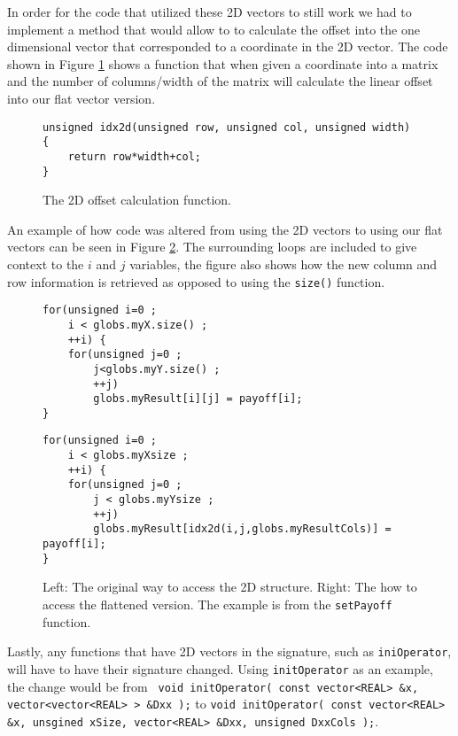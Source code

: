 In order for the code that utilized these 2D vectors to still work we had to
implement a method that would allow to to calculate the offset into the one
dimensional vector that corresponded to a coordinate in the 2D vector. The code
shown in Figure \ref{code:idx2d} shows a function that when given a coordinate
into a matrix and the number of columns/width of the matrix will calculate the
linear offset into our flat vector version.

\begin{figure}[H]
    \begin{lstlisting}
unsigned idx2d(unsigned row, unsigned col, unsigned width) {
    return row*width+col;
}
    \end{lstlisting}
    \caption{The 2D offset calculation function.}
    \label{code:idx2d}
\end{figure}

An example of how code was altered from using the 2D vectors to using our flat
vectors can be seen in Figure \ref{code:2dto1dcoord}. The surrounding loops are
included to give context to the $i$ and $j$ variables, the figure also shows how
the new column and row information is retrieved as opposed to using the
\texttt{size()} function.

\begin{figure}[H]
    \begin{minipage}{.45\textwidth}
        \begin{lstlisting}
for(unsigned i=0 ;
    i < globs.myX.size() ;
    ++i) {
    for(unsigned j=0 ;
        j<globs.myY.size() ;
        ++j) 
        globs.myResult[i][j] = payoff[i];
}
        \end{lstlisting}
    \end{minipage}\hfill
    \begin{minipage}{.45\textwidth}
        \begin{lstlisting}
for(unsigned i=0 ;
    i < globs.myXsize ;
    ++i) {
    for(unsigned j=0 ;
        j < globs.myYsize ;
        ++j) 
        globs.myResult[idx2d(i,j,globs.myResultCols)] = payoff[i];
}
        \end{lstlisting}
    \end{minipage}
    \caption{Left: The original way to access the 2D structure. Right: The how
    to access the flattened version. The example is from the
    \texttt{setPayoff} function.}
    \label{code:2dto1dcoord}
\end{figure}

Lastly, any functions that have 2D vectors in the signature, such as
\texttt{iniOperator}, will have to have their signature changed. Using
\texttt{initOperator} as an example, the change would be from \texttt{
void initOperator(  const vector<REAL> \&x, vector<vector<REAL> > \&Dxx );} to
\texttt{void initOperator(  const vector<REAL> \&x, unsgined xSize, vector<REAL>
\&Dxx, unsigned DxxCols );}.

